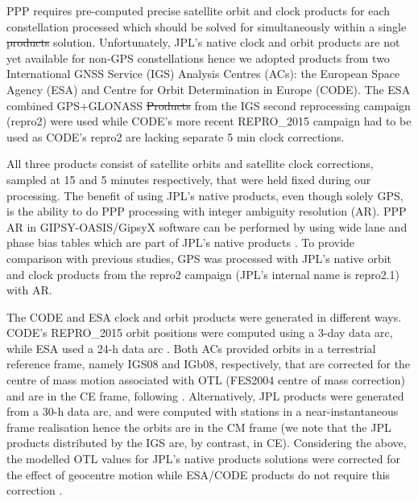 \documentclass[se, manuscript]{copernicus}
\providecommand{\DIFadd}[1]{{\protect\color{blue}\uwave{#1}}} %
\providecommand{\DIFdel}[1]{{\protect\color{red}\sout{#1}}}                      %
\providecommand{\DIFaddbegin}{} %
\providecommand{\DIFaddend}{} %
\providecommand{\DIFdelbegin}{} %
\providecommand{\DIFdelend}{} %
\begin{document}
PPP requires pre-computed precise satellite orbit and clock products for each constellation processed which should be solved for simultaneously within a single \DIFdelbegin \DIFdel{products }\DIFdelend \DIFaddbegin \DIFadd{product's }\DIFaddend solution. Unfortunately, JPL’s native clock and orbit products are not yet available for non-GPS constellations hence we adopted products from two International GNSS Service (IGS) \citep{Johnston2017} Analysis Centres (ACs): the European Space Agency (ESA) and Centre for Orbit Determination in Europe (CODE). The ESA combined GPS+GLONASS \DIFdelbegin \DIFdel{Products }\DIFdelend \DIFaddbegin \DIFadd{products }\DIFaddend from the IGS second reprocessing campaign (repro2) were used \citep{Griffiths2019} while CODE’s more recent REPRO\_2015 campaign \citep{repro2015} had to be used as CODE’s repro2 are lacking separate 5 min clock corrections.

All three products consist of satellite orbits and satellite clock corrections, sampled at 15 and 5 minutes respectively, that were held fixed during our processing. The benefit of using JPL’s native products, even though solely GPS, is the ability to do PPP processing with integer ambiguity resolution (AR). PPP AR in GIPSY-OASIS/GipsyX software can be performed by using wide lane and phase bias tables which are part of JPL’s native products \citep{Bertiger2010}. To provide comparison with previous studies, GPS was processed with JPL’s native orbit and clock products from the repro2 campaign (JPL’s internal name is repro2.1) with AR.

The CODE and ESA clock and orbit products were generated in different ways. CODE’s REPRO\_2015 orbit positions were computed using a 3-day data arc, while ESA used a 24-h data arc \citep{Griffiths2019}. Both ACs provided orbits in a terrestrial reference frame, namely IGS08 and IGb08, respectively, that are corrected for the centre of mass \DIFaddbegin \DIFadd{(geocentre) }\DIFaddend motion associated with OTL (FES2004 centre of mass correction) and are in the CE frame, following \cite{Blewitt2003}. Alternatively, JPL products were generated from a 30-h data arc, and were computed with stations in a near-instantaneous frame realisation hence the orbits are in the CM frame (we note that the JPL products distributed by the IGS are, by contrast, in CE). Considering the above, the modelled OTL values for JPL’s native products solutions were corrected for the effect of geocentre motion while ESA/CODE products do not require this correction \citep{Kouba2009}.
\end{document}
